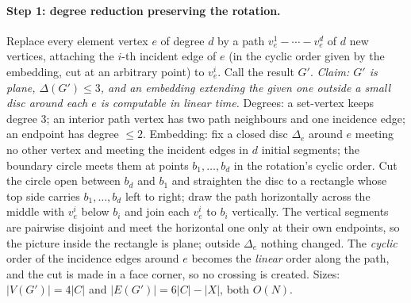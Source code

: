 \documentclass[11pt,a4paper]{article}
\theoremstyle{plain}
\theoremstyle{definition}
\theoremstyle{plain}
\theoremstyle{definition}
\theoremstyle{remark}
\begin{document}
\paragraph{Step 1: degree reduction preserving the rotation.} Replace every element vertex $e$ of
degree $d$ by a path $v_e^1 - \cdots - v_e^d$ of $d$ new vertices, attaching the $i$-th incident
edge of $e$ (in the cyclic order given by the embedding, cut at an arbitrary point) to $v_e^i$.
Call the result $G'$. \emph{Claim: $G'$ is plane, $\Delta(G')\le 3$, and an embedding extending
the given one outside a small disc around each $e$ is computable in linear time.} Degrees: a
set-vertex keeps degree 3; an interior path vertex has two path neighbours and one incidence
edge; an endpoint has degree $\le 2$. Embedding: fix a closed disc $\Delta_e$ around $e$ meeting
no other vertex and meeting the incident edges in $d$ initial segments; the boundary circle meets
them at points $b_1,\dots,b_d$ in the rotation's cyclic order. Cut the circle open between $b_d$
and $b_1$ and straighten the disc to a rectangle whose top side carries $b_1,\dots,b_d$ left to
right; draw the path horizontally across the middle with $v_e^i$ below $b_i$ and join each
$v_e^i$ to $b_i$ vertically. The vertical segments are pairwise disjoint and meet the horizontal
one only at their own endpoints, so the picture inside the rectangle is plane; outside $\Delta_e$
nothing changed. The \emph{cyclic} order of the incidence edges around $e$ becomes the
\emph{linear} order along the path, and the cut is made in a face corner, so no crossing is
created. Sizes: $|V(G')|=4|C|$ and $|E(G')|=6|C|-|X|$, both $O(N)$.
\end{document}
